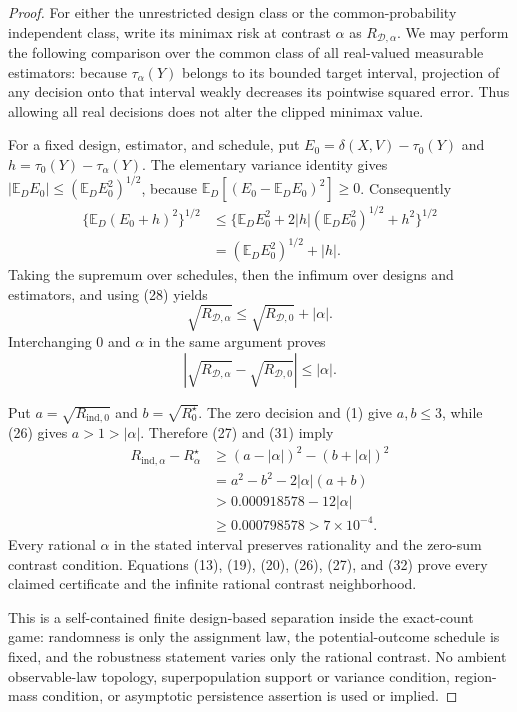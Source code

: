\documentclass{article}
\begin{document}
\begin{proof}
For either the unrestricted design class or the common-probability independent class, write its minimax risk at contrast \(\alpha\) as \(R_{\mathcal D,\alpha}\).  We may perform the following comparison over the common class of all real-valued measurable estimators: because \(\tau_\alpha(Y)\) belongs to its bounded target interval, projection of any decision onto that interval weakly decreases its pointwise squared error.  Thus allowing all real decisions does not alter the clipped minimax value.

For a fixed design, estimator, and schedule, put \(E_0=\delta(X,V)-\tau_0(Y)\) and \(h=\tau_0(Y)-\tau_\alpha(Y)\).  The elementary variance identity gives \(|\mathbb E_D E_0|\le(\mathbb E_D E_0^2)^{1/2}\), because \(\mathbb E_D[(E_0-\mathbb E_D E_0)^2]\ge0\).  Consequently
\[
\begin{aligned}
\{\mathbb E_D(E_0+h)^2\}^{1/2}
&\le \{\mathbb E_D E_0^2
       +2|h|(\mathbb E_D E_0^2)^{1/2}+h^2\}^{1/2}\\
&=(\mathbb E_D E_0^2)^{1/2}+|h|.
\end{aligned}                                                               \tag{29}
\]
Taking the supremum over schedules, then the infimum over designs and estimators, and using (28) yields
\[
\sqrt{R_{\mathcal D,\alpha}}
\le\sqrt{R_{\mathcal D,0}}+|\alpha|.                                     \tag{30}
\]
Interchanging \(0\) and \(\alpha\) in the same argument proves
\[
\left|\sqrt{R_{\mathcal D,\alpha}}
      -\sqrt{R_{\mathcal D,0}}\right|\le|\alpha|.                        \tag{31}
\]

Put \(a=\sqrt{R_{\mathrm{ind},0}}\) and \(b=\sqrt{R^\star_0}\).  The zero decision and (1) give \(a,b\le3\), while (26) gives \(a>1>|\alpha|\).  Therefore (27) and (31) imply
\[
\begin{aligned}
R_{\mathrm{ind},\alpha}-R^\star_\alpha
&\ge(a-|\alpha|)^2-(b+|\alpha|)^2\\
&=a^2-b^2-2|\alpha|(a+b)\\
&>0.000918578-12|\alpha|\\
&\ge0.000798578>7\times10^{-4}.
\end{aligned}                                                               \tag{32}
\]
Every rational \(\alpha\) in the stated interval preserves rationality and the zero-sum contrast condition.  Equations (13), (19), (20), (26), (27), and (32) prove every claimed certificate and the infinite rational contrast neighborhood.

This is a self-contained finite design-based separation inside the exact-count game: randomness is only the assignment law, the potential-outcome schedule is fixed, and the robustness statement varies only the rational contrast.  No ambient observable-law topology, superpopulation support or variance condition, region-mass condition, or asymptotic persistence assertion is used or implied.
\end{proof}
\end{document}
